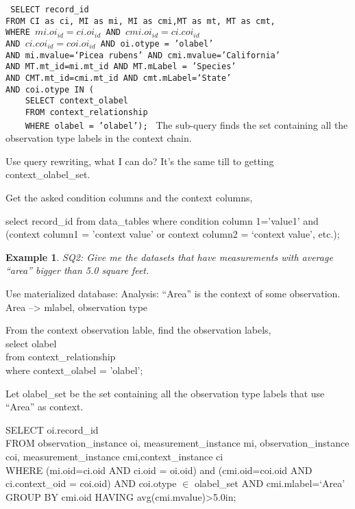 \documentclass[conference]{IEEEtran}
\newtheorem{example}{Example}[section]
\begin{document}
{\tt 
SELECT record\_id\\
FROM CI as ci, MI as mi, MI as cmi,MT as mt, MT as cmt, \\
WHERE $mi.oi_{id}=ci.oi_{id}$ AND $cmi.oi_{id}=ci.coi_{id}$ \\
AND $ci.coi_{id} = coi.oi_{id}$ AND oi.otype = 'olabel' \\
AND mi.mvalue=`Picea rubens' AND cmi.mvalue='California'\\
AND MT.mt_{id}=mi.mt_{id} AND MT.mLabel = 'Species'\\
AND CMT.mt_{id}=cmi.mt_{id} AND cmt.mLabel=`State'\\
AND coi.otype IN (\\
\verb|    |SELECT context\_olabel\\
\verb|    |FROM context\_relationship\\
\verb|    |WHERE olabel = 'olabel');
}
The sub-query finds the set containing all the observation type
labels in the context chain.

Use query rewriting, what I can do? 
It's the same till to getting context\_olabel\_set. 

Get the asked condition columns and the context columns, 

select record\_id from data\_tables
where condition column 1='value1' and (context column1 = 'context
value' or context column2 = `context value', etc.);

\begin{example}
SQ2: Give me the datasets that have measurements with average ``area''
bigger than 5.0 square feet. 
\end{example}

Use materialized database: 
Analysis: ``Area'' is the context of some observation.
Area --> mlabel, observation type

From the context observation lable, find the observation labels, \\
select olabel\\
from context\_relationship\\
where context\_olabel = 'olabel'; 

Let olabel\_set  be the set containing all the observation type
labels that use ``Area'' as context. 

SELECT oi.record\_id \\
FROM observation\_instance oi, measurement\_instance mi, 
observation\_instance coi, measurement\_instance cmi,context\_instance ci\\
WHERE (mi.oid=ci.oid AND ci.oid = oi.oid) and (cmi.oid=coi.oid AND ci.context\_oid =
coi.oid) AND coi.otype $\in$ olabel\_set 
AND cmi.mlabel=`Area'
GROUP BY cmi.oid
HAVING avg(cmi.mvalue)>5.0in;
\end{document}
